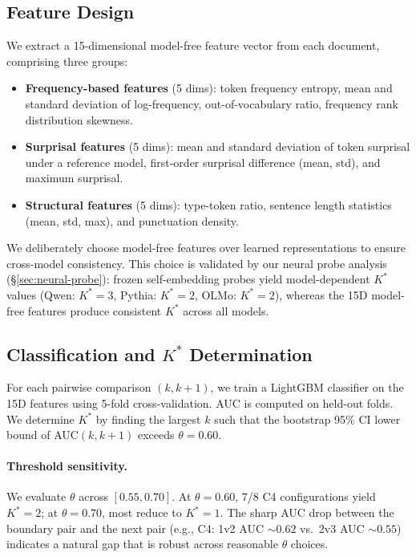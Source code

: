 \documentclass[11pt]{article}
\begin{document}
\subsection{Feature Design}

We extract a 15-dimensional model-free feature vector from each document, comprising three groups:

\begin{itemize}
    \item \textbf{Frequency-based features} (5 dims): token frequency entropy, mean and standard deviation of log-frequency, out-of-vocabulary ratio, frequency rank distribution skewness.
    \item \textbf{Surprisal features} (5 dims): mean and standard deviation of token surprisal under a reference model, first-order surprisal difference (mean, std), and maximum surprisal.
    \item \textbf{Structural features} (5 dims): type-token ratio, sentence length statistics (mean, std, max), and punctuation density.
\end{itemize}

We deliberately choose model-free features over learned representations to ensure cross-model consistency. This choice is validated by our neural probe analysis (\S\ref{sec:neural-probe}): frozen self-embedding probes yield model-dependent $K^*$ values (Qwen: $K^*{=}3$, Pythia: $K^*{=}2$, OLMo: $K^*{=}2$), whereas the 15D model-free features produce consistent $K^*$ across all models.

\subsection{Classification and $K^*$ Determination}

For each pairwise comparison $(k, k{+}1)$, we train a LightGBM classifier on the 15D features using 5-fold cross-validation. AUC is computed on held-out folds. We determine $K^*$ by finding the largest $k$ such that the bootstrap 95\% CI lower bound of AUC$(k, k{+}1)$ exceeds $\theta = 0.60$.

\paragraph{Threshold sensitivity.} We evaluate $\theta$ across $[0.55, 0.70]$. At $\theta = 0.60$, 7/8 C4 configurations yield $K^*{=}2$; at $\theta = 0.70$, most reduce to $K^*{=}1$. The sharp AUC drop between the boundary pair and the next pair (e.g., C4: 1v2 AUC $\sim 0.62$ vs.\ 2v3 AUC $\sim 0.55$) indicates a natural gap that is robust across reasonable $\theta$ choices.
\end{document}

